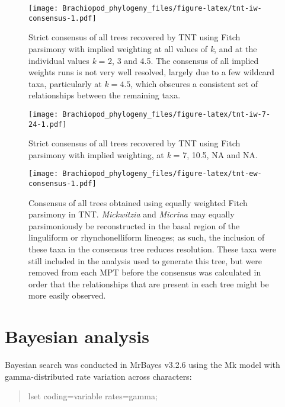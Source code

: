 \documentclass[openany]{book}
\theoremstyle{definition}
\theoremstyle{definition}
\theoremstyle{definition}
\theoremstyle{remark}
\begin{document}
\begin{figure}
\centering
\texttt{[image: Brachiopod\_phylogeny\_files/figure-latex/tnt-iw-consensus-1.pdf]}
\caption{\label{fig:tnt-iw-consensus}Strict consensus of all trees recovered by TNT
using Fitch parsimony with implied weighting at all values of \emph{k}, and at the individual
values \emph{k} = 2, 3 and 4.5.
The consensus of all implied weights runs is
not very well resolved, largely due to a few wildcard taxa, particularly
at \(k = 4.5\), which obscures a consistent set of relationships between
the remaining taxa.}
\end{figure}

\begin{figure}
\centering
\texttt{[image: Brachiopod\_phylogeny\_files/figure-latex/tnt-iw-7-24-1.pdf]}
\caption{\label{fig:tnt-iw-7-24}Strict consensus of all trees recovered by TNT
using Fitch parsimony with implied weighting, at \emph{k} = 7, 10.5, NA and NA.}
\end{figure}

\newpage










\begin{figure}
\centering
\texttt{[image: Brachiopod\_phylogeny\_files/figure-latex/tnt-ew-consensus-1.pdf]}
\caption{\label{fig:tnt-ew-consensus}Consensus of all trees obtained using equally weighted
Fitch parsimony in TNT. \emph{Mickwitzia} and \emph{Micrina} may equally
parsimoniously be reconstructed in the basal region of the linguliform
or rhynchonelliform lineages; as such, the inclusion of these taxa in
the consensus tree reduces resolution. These taxa were still included in
the analysis used to generate this tree, but were removed from each MPT
before the consensus was calculated in order that the relationships that
are present in each tree might be more easily observed.}
\end{figure}

\hypertarget{bayesian}{\chapter{Bayesian analysis}\label{bayesian}}

Bayesian search was conducted in MrBayes v3.2.6 \citep{Ronquist2012}
using the Mk model \citep{Lewis2001} with gamma-distributed rate
variation across characters:

\begin{quote}
lset coding=variable rates=gamma;
\end{quote}
\end{document}

